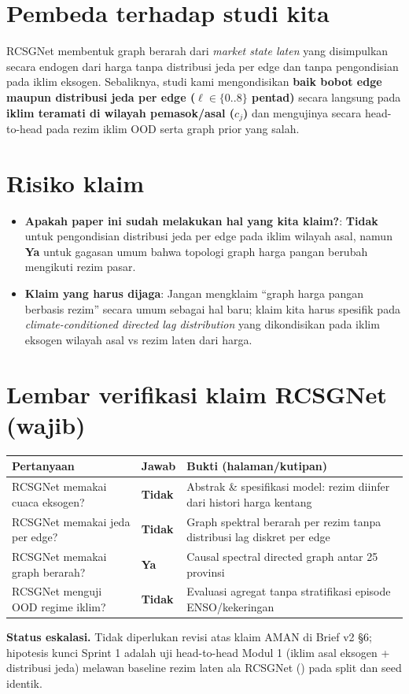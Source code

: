 \documentclass[11pt,a4paper]{article}
\begin{document}
\section{Pembeda terhadap studi kita}
RCSGNet membentuk graph berarah dari \emph{market state laten} yang disimpulkan secara endogen dari harga tanpa distribusi jeda per edge dan tanpa pengondisian pada iklim eksogen. Sebaliknya, studi kami mengondisikan \textbf{baik bobot edge maupun distribusi jeda per edge ($\ell \in \{0..8\}$ pentad)} secara langsung pada \textbf{iklim teramati di wilayah pemasok/asal ($c_j$)} dan mengujinya secara head-to-head pada rezim iklim OOD serta graph prior yang salah.

\section{Risiko klaim}
\begin{itemize}
  \item \textbf{Apakah paper ini sudah melakukan hal yang kita klaim?}: \textbf{Tidak} untuk pengondisian distribusi jeda per edge pada iklim wilayah asal, namun \textbf{Ya} untuk gagasan umum bahwa topologi graph harga pangan berubah mengikuti rezim pasar.
  \item \textbf{Klaim yang harus dijaga}: Jangan mengklaim ``graph harga pangan berbasis rezim'' secara umum sebagai hal baru; klaim kita harus spesifik pada \emph{climate-conditioned directed lag distribution} yang dikondisikan pada iklim eksogen wilayah asal vs rezim laten dari harga.
\end{itemize}

\section*{Lembar verifikasi klaim RCSGNet (wajib)}
\begin{table}[H]
\centering
\small
\begin{tabular}{@{}L{6.4cm}C{2.0cm}L{6.0cm}@{}}
\toprule
Pertanyaan & Jawab & Bukti (halaman/kutipan) \\
\midrule
RCSGNet memakai cuaca eksogen? & \textbf{Tidak} & Abstrak \& spesifikasi model: rezim diinfer dari histori harga kentang \\
RCSGNet memakai jeda per edge? & \textbf{Tidak} & Graph spektral berarah per rezim tanpa distribusi lag diskret per edge \\
RCSGNet memakai graph berarah? & \textbf{Ya} & Causal spectral directed graph antar 25 provinsi \\
RCSGNet menguji OOD regime iklim? & \textbf{Tidak} & Evaluasi agregat tanpa stratifikasi episode ENSO/kekeringan \\
\bottomrule
\end{tabular}
\end{table}

\noindent\textbf{Status eskalasi.} Tidak diperlukan revisi atas klaim AMAN di Brief v2 \S6; hipotesis kunci Sprint 1 adalah uji head-to-head Modul 1 (iklim asal eksogen + distribusi jeda) melawan baseline rezim laten ala RCSGNet () pada split dan seed identik.
\end{document}
